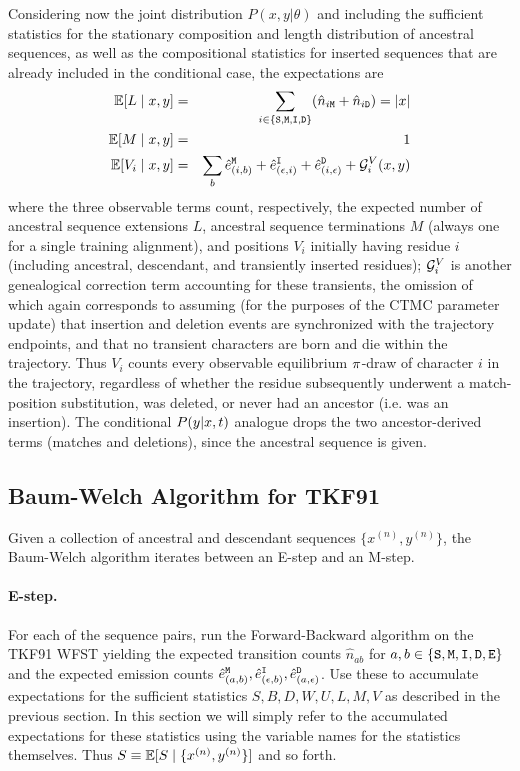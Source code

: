 Considering now the joint distribution $P(x,y|\theta)$ and including the sufficient statistics for the stationary composition and length distribution of ancestral sequences,
as well as the compositional statistics for inserted sequences that are already included in the conditional case, the expectations are
\begin{eqnarray*}
\mathbb{E}[L \mid x,y]
& = & \sum_{i \in \{{\tt S},{\tt M},{\tt I},{\tt D}\}} (\hat{n}_{i{\tt M}} + \hat{n}_{i{\tt D}}) = |x|
\\
\mathbb{E}[M \mid x,y]
& = &
1
\\
\mathbb{E}[V_i \mid x,y] & = & \sum_b \hat{e}^{\tt M}_{(i,b)} + \hat{e}^{\tt I}_{(\epsilon,i)} + \hat{e}^{\tt D}_{(i,\epsilon)} + \mathcal{G}^V_i (x,y)
\end{eqnarray*}
where the three observable terms count, respectively, the expected number of
ancestral sequence extensions $L$,
ancestral sequence terminations $M$ (always one for a single training alignment),
and positions $V_i$ initially having residue $i$ (including ancestral, descendant, and transiently inserted residues);
$\mathcal{G}^V_i$ is another genealogical correction term accounting for these transients,
the omission of which again corresponds to assuming (for the purposes of the CTMC parameter update) that insertion and deletion events are synchronized with the trajectory endpoints, and that no transient characters are born and die within the trajectory.
Thus $V_i$ counts every observable equilibrium $\pi$-draw of character $i$ in the trajectory, regardless of whether the residue subsequently underwent a match-position substitution, was deleted, or never had an ancestor (i.e. was an insertion).
The conditional $P(y | x, t)$ analogue drops the two ancestor-derived terms (matches and deletions), since the ancestral sequence is given.



\subsection{Baum-Welch Algorithm for TKF91}
\label{sec:bw-tkf91}

Given a collection of ancestral and descendant sequences $\{ x^{(n)}, y^{(n)} \}$,
the Baum-Welch algorithm iterates between an E-step and an M-step.

\paragraph{E-step.}
For each of the sequence pairs,
run the Forward-Backward algorithm on the TKF91 WFST
yielding the expected transition counts $\hat{n}_{ab}$ for $a,b \in \{{\tt S},{\tt M},{\tt I},{\tt D},{\tt E}\}$
and the expected emission counts $\hat{e}^{\tt M}_{(a,b)}, \hat{e}^{\tt I}_{(\epsilon,b)}, \hat{e}^{\tt D}_{(a,\epsilon)}$.
Use these to accumulate expectations for the sufficient statistics $S, B, D, W, U, L, M, V$ as described in the previous section.
In this section we will simply refer to the accumulated expectations for these statistics using the variable names for the statistics themselves.
Thus $S \equiv \mathbb{E}[S \mid \{x^{(n)}, y^{(n)}\}]$ and so forth.

